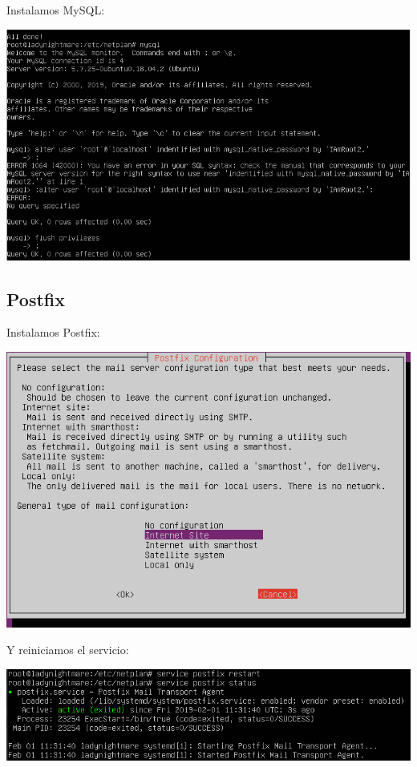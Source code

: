 \documentclass{article}
\begin{document}
Instalamos MySQL:

\begin{center}
\includegraphics[scale=0.4]{images/mysql.png}
\end{center}

\subsection{Postfix}

Instalamos Postfix:

\begin{center}
\includegraphics[scale=0.6]{images/postfix.png}
\end{center}

Y reiniciamos el servicio:

\begin{center}
\includegraphics[scale=0.6]{images/postfixR.png}
\end{center}
\end{document}
